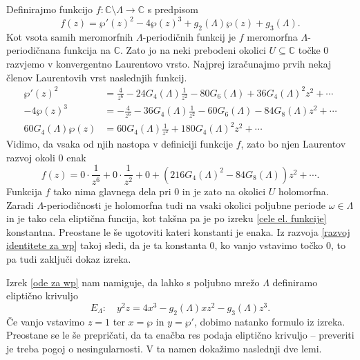 \documentclass[mat1]{fmfdelo}
\numberwithin{equation}{section}
\newcommand{\C}{\mathbb C}
\newcommand{\om}{\omega}
\theoremstyle{definition}
\begin{document}
\begin{dokaz}
    Definirajmo funkcijo $f:\C\setminus\Lambda \to \C$ s predpisom
    \[
        f(z) = \wp'(z)^2 - 4\wp(z)^3 + g_2(\Lambda)\wp(z) + g_3(\Lambda).
    \]
    Kot vsota samih meromorfnih $\Lambda$-periodičnih funkcij je $f$ meromorfna $\Lambda$-periodičnana funkcija na $\C$. Zato jo na neki prebodeni okolici $U \subseteq \C$ točke $0$ razvjemo v konvergentno Laurentovo vrsto. Najprej izračunajmo prvih nekaj členov Laurentovih vrst naslednjih funkcij.
    \begin{align*}
        \wp'(z)^2 &= \frac{4}{z^6} - 24G_4(\Lambda)\frac{1}{z^2} - 80G_6(\Lambda) + 36G_4(\Lambda)^2z^2 + \cdots \\
        -4\wp(z)^3 &= -\frac{4}{z^6} - 36G_4(\Lambda) \frac{1}{z^2} - 60G_6(\Lambda) - 84G_8(\Lambda)z^2 + \cdots \\
        60G_4(\Lambda)\wp(z) &= 60G_4(\Lambda)\frac{1}{z^2} + 180G_4(\Lambda)^2z^2 + \cdots  
    \end{align*}
    Vidimo, da vsaka od njih nastopa v definiciji funkcije $f$, zato bo njen Laurentov razvoj okoli $0$ enak
    \begin{equation}
        \label{razvoj identitete za wp}    
        f(z) = 0 \cdot \frac{1}{z^6} + 0 \cdot \frac{1}{z^2} + 0 + (216G_4(\Lambda)^2 - 84G_8(\Lambda))z^2 + \cdots.
    \end{equation}
    Funkcija $f$ tako nima glavnega dela pri $0$ in je zato na okolici $U$ holomorfna. Zaradi $\Lambda$-periodičnosti je holomorfna tudi na vsaki okolici poljubne periode $\om\in\Lambda$ in je tako cela eliptična funcija, kot takšna pa je po izreku \ref{cele el. funkcije} konstantna. Preostane le še ugotoviti kateri konstanti je enaka. Iz razvoja \ref{razvoj identitete za wp} takoj sledi, da je ta konstanta $0$, ko vanjo vstavimo točko $0$, to pa tudi zaključi dokaz izreka.
\end{dokaz}

Izrek \ref{ode za wp} nam namiguje, da lahko s poljubno mrežo $\Lambda$ definiramo eliptično krivuljo
\begin{equation}
    \label{elipticna krivulja glede na mrezo}    
    E_\Lambda : \quad y^2 z = 4x^3 - g_2(\Lambda)x z^2 - g_3(\Lambda) z^3.
\end{equation}
Če vanjo vstavimo $z = 1$ ter $x = \wp$ in $y = \wp'$, dobimo natanko formulo iz izreka. Preostane se le še prepričati, da ta enačba res podaja eliptično krivuljo -- preveriti je treba pogoj o nesingularnosti. V ta namen dokažimo naslednji dve lemi.
\end{document}
